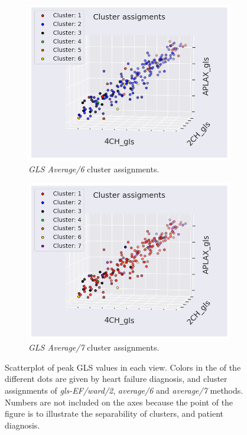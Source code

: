 \begin{figure}[htb]
    \begin{subfigure}[b]{0.49\textwidth}
        \centering
        \includegraphics[width=0.99\textwidth]{results/pd/scatter_gls_average6.png}
        \caption{\textit{GLS Average/6} cluster assignments.}
        \label{fig:scatter_gls_ef_complete2}
    \end{subfigure}
    \begin{subfigure}[b]{0.49\textwidth}
        \centering
        \includegraphics[width=0.99\textwidth]{results/pd/scatter_gls_average7.png}
        \caption{\textit{GLS Average/7} cluster assignments.}
        \label{fig:scatter_gls_ef_average2}
    \end{subfigure}
    \caption{Scatterplot of peak GLS values in each view. Colors in the of the different dots are given by heart failure diagnosis, and cluster assignments of 
             \textit{gls-EF/ward/2}, \textit{average/6} and \textit{average/7} methods. Numbers are not included on the axes because the point of the figure is to illustrate the separability 
             of clusters, and patient diagnosis.}
             \label{fig:scatter_gls_ef_hf_cluster_assignments}
\end{figure}

